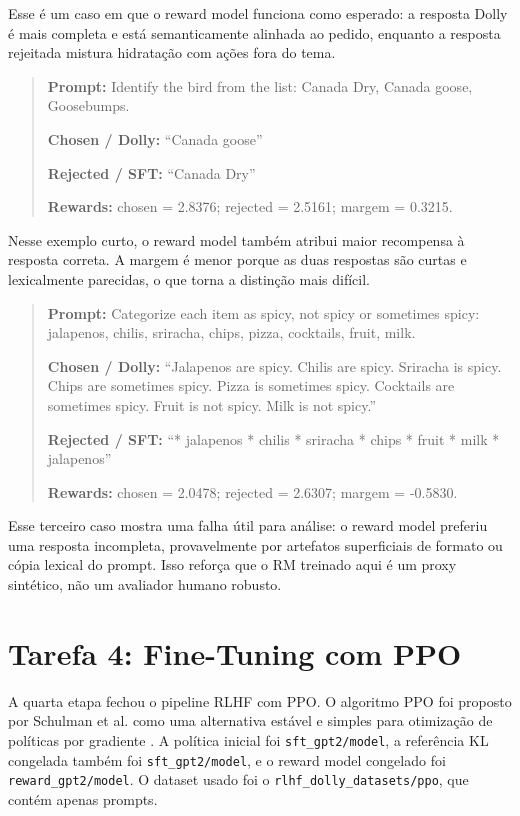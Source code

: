 \documentclass[a4paper,12pt]{article}
\begin{document}
Esse é um caso em que o reward model funciona como esperado: a resposta Dolly é mais completa e está semanticamente alinhada ao pedido, enquanto a resposta rejeitada mistura hidratação com ações fora do tema.

\begin{quote}
\small
\textbf{Prompt:} Identify the bird from the list: Canada Dry, Canada goose, Goosebumps.

\textbf{Chosen / Dolly:} ``Canada goose''

\textbf{Rejected / SFT:} ``Canada Dry''

\textbf{Rewards:} chosen = 2.8376; rejected = 2.5161; margem = 0.3215.
\end{quote}

Nesse exemplo curto, o reward model também atribui maior recompensa à resposta correta. A margem é menor porque as duas respostas são curtas e lexicalmente parecidas, o que torna a distinção mais difícil.

\begin{quote}
\small
\textbf{Prompt:} Categorize each item as spicy, not spicy or sometimes spicy: jalapenos, chilis, sriracha, chips, pizza, cocktails, fruit, milk.

\textbf{Chosen / Dolly:} ``Jalapenos are spicy. Chilis are spicy. Sriracha is spicy. Chips are sometimes spicy. Pizza is sometimes spicy. Cocktails are sometimes spicy. Fruit is not spicy. Milk is not spicy.''

\textbf{Rejected / SFT:} ``* jalapenos * chilis * sriracha * chips * fruit * milk * jalapenos''

\textbf{Rewards:} chosen = 2.0478; rejected = 2.6307; margem = -0.5830.
\end{quote}

Esse terceiro caso mostra uma falha útil para análise: o reward model preferiu uma resposta incompleta, provavelmente por artefatos superficiais de formato ou cópia lexical do prompt. Isso reforça que o RM treinado aqui é um proxy sintético, não um avaliador humano robusto.

\section{Tarefa 4: Fine-Tuning com PPO}

A quarta etapa fechou o pipeline RLHF com PPO. O algoritmo PPO foi proposto por Schulman et al. como uma alternativa estável e simples para otimização de políticas por gradiente \cite{schulman2017proximal}. A política inicial foi \texttt{sft\_gpt2/model}, a referência KL congelada também foi \texttt{sft\_gpt2/model}, e o reward model congelado foi \texttt{reward\_gpt2/model}. O dataset usado foi o \texttt{rlhf\_dolly\_datasets/ppo}, que contém apenas prompts.
\end{document}
